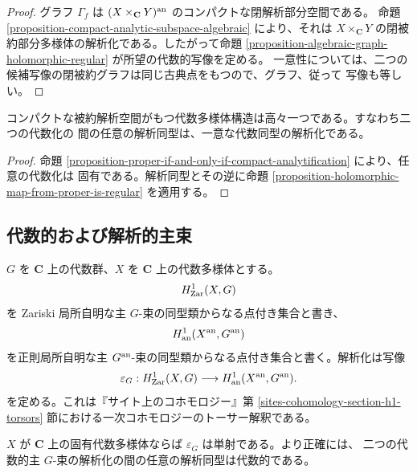 \begin{proof}
グラフ $\Gamma_f$ は $(X\times_{\mathbf C}Y)^{\rm an}$ のコンパクトな閉解析部分空間である。
命題 \ref{proposition-compact-analytic-subspace-algebraic} により、それは
$X\times_{\mathbf C}Y$ の閉被約部分多様体の解析化である。したがって命題
\ref{proposition-algebraic-graph-holomorphic-regular} が所望の代数的写像を定める。
一意性については、二つの候補写像の閉被約グラフは同じ古典点をもつので、グラフ、従って
写像も等しい。
\end{proof}

\begin{proposition}[系]
\label{corollary-compact-analytic-space-unique-algebraization}
\begin{reference}
\cite[\S 4、第19項、命題15の系]{GAGA}
\end{reference}
コンパクトな被約解析空間がもつ代数多様体構造は高々一つである。すなわち二つの代数化の
間の任意の解析同型は、一意な代数同型の解析化である。
\end{proposition}

\begin{proof}
命題 \ref{proposition-proper-if-and-only-if-compact-analytification} により、任意の代数化は
固有である。解析同型とその逆に命題
\ref{proposition-holomorphic-map-from-proper-is-regular} を適用する。
\end{proof}


\subsection{代数的および解析的主束}
\label{subsection-gaga-principal-bundles}

\begin{definition}
\label{definition-principal-bundle-analytification-map}
\begin{reference}
\cite[\S 4、第20項]{GAGA}
\end{reference}
$G$ を $\mathbf C$ 上の代数群、$X$ を $\mathbf C$ 上の代数多様体とする。
$$
H^1_{\rm Zar}(X,G)
$$
を Zariski 局所自明な主 $G$-束の同型類からなる点付き集合と書き、
$$
H^1_{\rm an}(X^{\rm an},G^{\rm an})
$$
を正則局所自明な主 $G^{\rm an}$-束の同型類からなる点付き集合と書く。解析化は写像
$$
\varepsilon_G:H^1_{\rm Zar}(X,G)
\longrightarrow H^1_{\rm an}(X^{\rm an},G^{\rm an}).
$$
を定める。これは『サイト上のコホモロジー』第
\ref{sites-cohomology-section-h1-torsors} 節における一次コホモロジーのトーサー解釈である。
\end{definition}

\begin{proposition}
\label{proposition-principal-bundle-analytification-injective}
\begin{reference}
\cite[\S 4、第20項、命題16]{GAGA}
\end{reference}
$X$ が $\mathbf C$ 上の固有代数多様体ならば $\varepsilon_G$ は単射である。より正確には、
二つの代数的主 $G$-束の解析化の間の任意の解析同型は代数的である。
\end{proposition}

